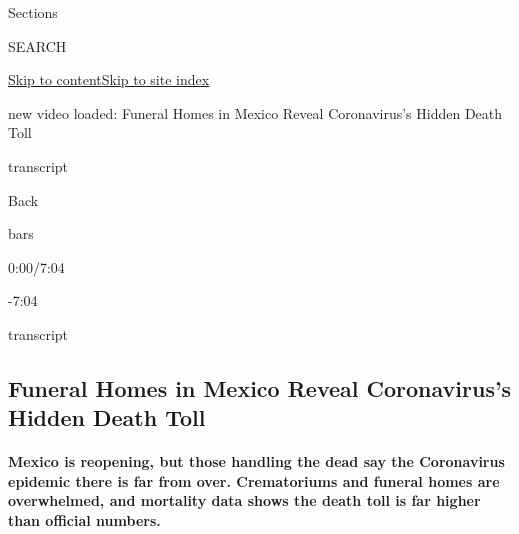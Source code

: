 Sections

SEARCH

\protect\hyperlink{site-content}{Skip to
content}\protect\hyperlink{site-index}{Skip to site index}

new video loaded: Funeral Homes in Mexico Reveal Coronavirus's Hidden
Death Toll

transcript

Back

bars

0:00/7:04

-7:04

transcript

\hypertarget{funeral-homes-in-mexico-reveal-coronaviruss-hidden-death-toll}{%
\subsection{Funeral Homes in Mexico Reveal Coronavirus's Hidden Death
Toll}\label{funeral-homes-in-mexico-reveal-coronaviruss-hidden-death-toll}}

\hypertarget{mexico-is-reopening-but-those-handling-the-dead-say-the-coronavirus-epidemic-there-is-far-from-over-crematoriums-and-funeral-homes-are-overwhelmed-and-mortality-data-shows-the-death-toll-is-far-higher-than-official-numbers}{%
\paragraph{Mexico is reopening, but those handling the dead say the
Coronavirus epidemic there is far from over. Crematoriums and funeral
homes are overwhelmed, and mortality data shows the death toll is far
higher than official
numbers.}\label{mexico-is-reopening-but-those-handling-the-dead-say-the-coronavirus-epidemic-there-is-far-from-over-crematoriums-and-funeral-homes-are-overwhelmed-and-mortality-data-shows-the-death-toll-is-far-higher-than-official-numbers}}

